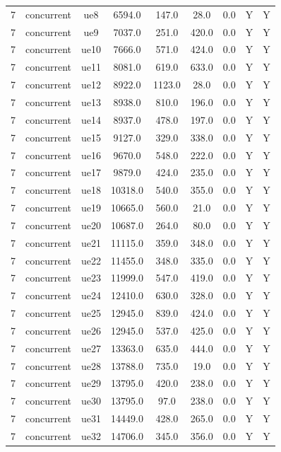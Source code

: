 \begin{table}[ht]
\begin{tabular}{|c|c|c|c|c|c|c|c|c|}
7 & concurrent & ue8 & 6594.0 & 147.0 & 28.0 & 0.0 & Y & Y \\
7 & concurrent & ue9 & 7037.0 & 251.0 & 420.0 & 0.0 & Y & Y \\
7 & concurrent & ue10 & 7666.0 & 571.0 & 424.0 & 0.0 & Y & Y \\
7 & concurrent & ue11 & 8081.0 & 619.0 & 633.0 & 0.0 & Y & Y \\
7 & concurrent & ue12 & 8922.0 & 1123.0 & 28.0 & 0.0 & Y & Y \\
7 & concurrent & ue13 & 8938.0 & 810.0 & 196.0 & 0.0 & Y & Y \\
7 & concurrent & ue14 & 8937.0 & 478.0 & 197.0 & 0.0 & Y & Y \\
7 & concurrent & ue15 & 9127.0 & 329.0 & 338.0 & 0.0 & Y & Y \\
7 & concurrent & ue16 & 9670.0 & 548.0 & 222.0 & 0.0 & Y & Y \\
7 & concurrent & ue17 & 9879.0 & 424.0 & 235.0 & 0.0 & Y & Y \\
7 & concurrent & ue18 & 10318.0 & 540.0 & 355.0 & 0.0 & Y & Y \\
7 & concurrent & ue19 & 10665.0 & 560.0 & 21.0 & 0.0 & Y & Y \\
7 & concurrent & ue20 & 10687.0 & 264.0 & 80.0 & 0.0 & Y & Y \\
7 & concurrent & ue21 & 11115.0 & 359.0 & 348.0 & 0.0 & Y & Y \\
7 & concurrent & ue22 & 11455.0 & 348.0 & 335.0 & 0.0 & Y & Y \\
7 & concurrent & ue23 & 11999.0 & 547.0 & 419.0 & 0.0 & Y & Y \\
7 & concurrent & ue24 & 12410.0 & 630.0 & 328.0 & 0.0 & Y & Y \\
7 & concurrent & ue25 & 12945.0 & 839.0 & 424.0 & 0.0 & Y & Y \\
7 & concurrent & ue26 & 12945.0 & 537.0 & 425.0 & 0.0 & Y & Y \\
7 & concurrent & ue27 & 13363.0 & 635.0 & 444.0 & 0.0 & Y & Y \\
7 & concurrent & ue28 & 13788.0 & 735.0 & 19.0 & 0.0 & Y & Y \\
7 & concurrent & ue29 & 13795.0 & 420.0 & 238.0 & 0.0 & Y & Y \\
7 & concurrent & ue30 & 13795.0 & 97.0 & 238.0 & 0.0 & Y & Y \\
7 & concurrent & ue31 & 14449.0 & 428.0 & 265.0 & 0.0 & Y & Y \\
7 & concurrent & ue32 & 14706.0 & 345.0 & 356.0 & 0.0 & Y & Y \\

\end{tabular}
\end{table}
